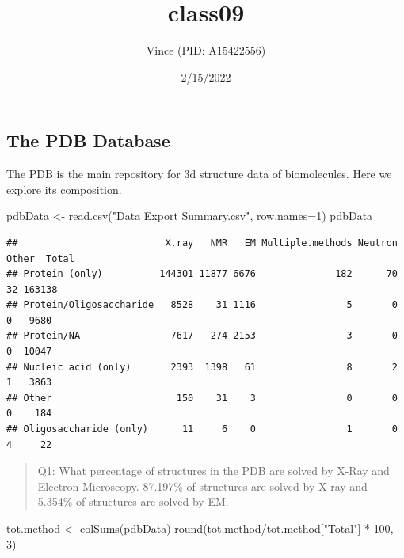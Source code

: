\documentclass[
]{article}
\title{class09}
\author{Vince (PID: A15422556)}
\date{2/15/2022}
\newenvironment{Shaded}{\begin{snugshade}}{\end{snugshade}}
\newcommand{\AttributeTok}[1]{\textcolor[rgb]{0.77,0.63,0.00}{#1}}
\newcommand{\DecValTok}[1]{\textcolor[rgb]{0.00,0.00,0.81}{#1}}
\newcommand{\FunctionTok}[1]{\textcolor[rgb]{0.00,0.00,0.00}{#1}}
\newcommand{\NormalTok}[1]{#1}
\newcommand{\OtherTok}[1]{\textcolor[rgb]{0.56,0.35,0.01}{#1}}
\newcommand{\SpecialCharTok}[1]{\textcolor[rgb]{0.00,0.00,0.00}{#1}}
\newcommand{\StringTok}[1]{\textcolor[rgb]{0.31,0.60,0.02}{#1}}
\begin{document}
\maketitle

\hypertarget{the-pdb-database}{%
\subsection{The PDB Database}\label{the-pdb-database}}

The PDB is the main repository for 3d structure data of biomolecules.
Here we explore its composition.

\begin{Shaded}
\begin{Highlighting}[]
\NormalTok{pdbData }\OtherTok{\textless{}{-}} \FunctionTok{read.csv}\NormalTok{(}\StringTok{"Data Export Summary.csv"}\NormalTok{, }\AttributeTok{row.names=}\DecValTok{1}\NormalTok{)}
\NormalTok{pdbData}
\end{Highlighting}
\end{Shaded}

\begin{verbatim}
##                          X.ray   NMR   EM Multiple.methods Neutron Other  Total
## Protein (only)          144301 11877 6676              182      70    32 163138
## Protein/Oligosaccharide   8528    31 1116                5       0     0   9680
## Protein/NA                7617   274 2153                3       0     0  10047
## Nucleic acid (only)       2393  1398   61                8       2     1   3863
## Other                      150    31    3                0       0     0    184
## Oligosaccharide (only)      11     6    0                1       0     4     22
\end{verbatim}

\begin{quote}
Q1: What percentage of structures in the PDB are solved by X-Ray and
Electron Microscopy. 87.197\% of structures are solved by X-ray and
5.354\% of structures are solved by EM.
\end{quote}

\begin{Shaded}
\begin{Highlighting}[]
\NormalTok{tot.method }\OtherTok{\textless{}{-}} \FunctionTok{colSums}\NormalTok{(pdbData)}
\FunctionTok{round}\NormalTok{(tot.method}\SpecialCharTok{/}\NormalTok{tot.method[}\StringTok{"Total"}\NormalTok{] }\SpecialCharTok{*} \DecValTok{100}\NormalTok{, }\DecValTok{3}\NormalTok{)}
\end{Highlighting}
\end{Shaded}
\end{document}

